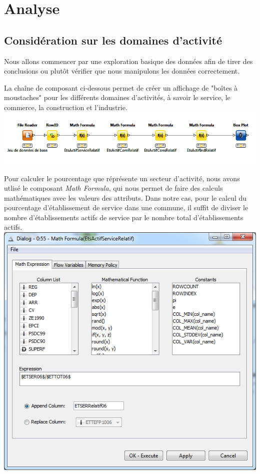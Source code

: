 \section{Analyse}

\subsection{Considération sur les domaines d'activité}

 Nous allons commencer par une exploration basique des données afin de tirer des conclusions ou plutôt vérifier que nous manipulons les données correctement.

La chaîne de composant ci-dessous permet de créer un affichage de "boîtes à moustaches" pour les différents domaines d'activités, à savoir le service, le commerce, la construction et l'industrie.
\includegraphics{png/BoxPlotDomainesActivité_knime.png}

Pour calculer le pourcentage que réprésente un secteur d'activité, nous avons utlisé le composant \textit{Math Formula}, qui nous permet de faire des calculs mathématiques avec les valeurs des attributs. Dans notre cas, pour le calcul du pourcentage d'établissement de service dans une commune, il suffit de diviser le nombre d'établissements actifs de service par le nombre total d'établissements actifs.
\includegraphics{png/MathFormulaEtsActifServiceRelatif.png}

